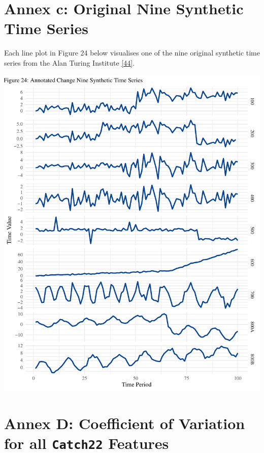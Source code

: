 \documentclass{article}
\begin{document}
\newpage

\hypertarget{annex-c-original-nine-synthetic-time-series}{%
\section{Annex c: Original Nine Synthetic Time
Series}\label{annex-c-original-nine-synthetic-time-series}}

\vspace{-0.4cm}

Each line plot in Figure 24 below visualises one of the nine original
synthetic time series from the Alan Turing Institute
\protect\hyperlink{ref-ATIChangePoint}{{[}44{]}}.

\includegraphics{210431461_CSC8639_Dissertation_files/figure-latex/unnamed-chunk-20-1.pdf}

\newpage

\hypertarget{annex-d-coefficient-of-variation-for-all-catch22-features}{%
\section{\texorpdfstring{Annex D: Coefficient of Variation for all
\texttt{Catch22}
Features}{Annex D: Coefficient of Variation for all Catch22 Features}}\label{annex-d-coefficient-of-variation-for-all-catch22-features}}
\end{document}
